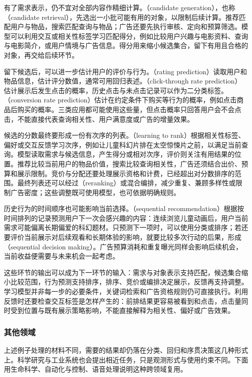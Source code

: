 有了需求表示，仍不宜对全部内容作精细计算。（candidate generation），也称（candidate retrieval），先选出一小批可能有用的对象，以限制后续计算。推荐匹配用户与物品，搜索匹配查询与物品；广告还要先执行审核、定向和预算筛选。模型可以利用交互或相关性标签学习匹配得分，例如比较用户兴趣与电影资料、查询与电影简介，或用户情境与广告信息。得分用来缩小候选集合，留下有用且合格的对象，再交给后续环节。

留下候选后，可以进一步估计用户的评价与行为。（rating prediction）读取用户和物品信息，估计评分数值，通常可用回归表述。（click-through rate prediction）估计展示后发生点击的概率，历史点击与未点击记录可以作为二分类标签。（conversion rate prediction）估计在约定条件下购买等行为的概率，例如点击商品后购买的概率。三类应用都可能使用这些量，但点击概率只回答用户会不会点击，不能直接代表查询相关性、用户满意度或广告的增量效果。

候选的分数最终要形成一份有次序的列表。（learning to rank）根据相关性标签、偏好或交互反馈学习次序，例如让儿童科幻片排在太空惊悚片之前，以满足当前查询。模型读取需求与候选信息，产生得分或相对次序，评价则关注有用结果的位置。推荐比较当前用户的物品价值，搜索比较查询相关性，广告还须结合出价、预算和展示限制。竞价与分配还要处理展示资格和计费，已经超出对分数排序的范围。最终列表还可以经过（reranking）或混合编排，减少重复、兼顾多样性或限制广告密度；这些调整既可使用模型，也可依据明确规则。

历史行为的时间顺序也可能影响当前选择。（sequential recommendation）根据按时间排列的记录预测用户下一次会感兴趣的内容：连续浏览儿童动画后，用户当前需求可能偏离长期偏爱的科幻题材。只预测下一项时，可以使用分类或排序；若还要评价当前展示对后续观看和长期体验的影响，就要比较多次行动的后果，形成（sequential decision making）。广告预算消耗和重复曝光同样会影响后续机会，当前收益便需要与未来机会一起考虑。

这些环节的输出可以成为下一环节的输入：需求与对象表示支持匹配，候选集合缩小比较范围，行为预测支持排序，排序、竞价或编排决定展示，反馈再支持调整。学习模型并非每一步的必要条件，关键词检索和广告资格规则仍可直接执行。利用反馈时还要检查交互标签是怎样产生的：前排结果更容易被看到和点击，点击量同时受到位置与既有展示策略影响，不能直接解释为相关性、偏好或广告效果。

\subsubsection{其他领域}
上述例子处理的材料不同，需要的结果却仍落在分类、回归和序贯决策这几种形式上。科学研究与工业系统也会提出相近任务，只是观测形式与使用约束不同。下面用生命科学、自动化与控制、语音处理说明这种跨领域复用。

